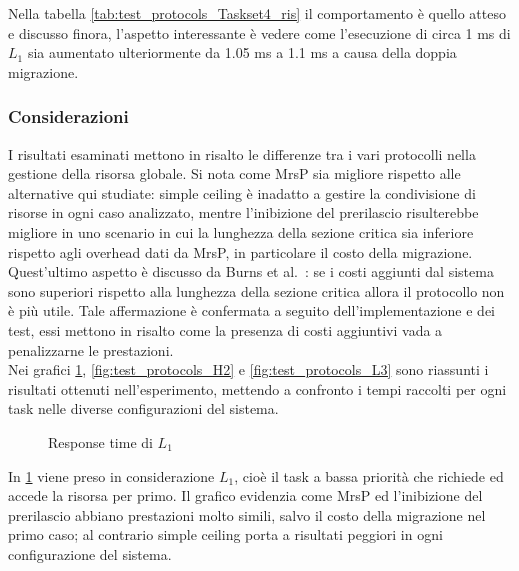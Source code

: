 \noindent Nella tabella \ref{tab:test_protocols_Taskset4_ris} il comportamento è quello atteso e discusso finora, l'aspetto interessante è vedere come l'esecuzione di circa 1 ms di $L_1$ sia aumentato ulteriormente da 1.05 ms a 1.1 ms a causa della doppia migrazione.

\subsubsection{Considerazioni}
\label{sec:confronto_protocolli_cons}

\noindent I risultati esaminati mettono in risalto le differenze tra i vari protocolli nella gestione della risorsa globale. Si nota come MrsP sia migliore rispetto alle alternative qui studiate: simple ceiling è inadatto a gestire la condivisione di risorse in ogni caso analizzato, mentre l'inibizione del prerilascio risulterebbe migliore in uno scenario in cui la lunghezza della sezione critica sia inferiore rispetto agli overhead dati da MrsP, in particolare il costo della migrazione.\\

\noindent Quest'ultimo aspetto è discusso da Burns et al.~\cite{Burns:2013:SCM:2547348.2547350}: se i costi aggiunti dal sistema sono superiori rispetto alla lunghezza della sezione critica allora il protocollo non è più utile. Tale affermazione è confermata a seguito dell'implementazione e dei test, essi mettono in risalto come la presenza di costi aggiuntivi vada a penalizzarne le prestazioni.\\

\noindent Nei grafici \ref{fig:test_protocols_L1}, \ref{fig:test_protocols_H2} e \ref{fig:test_protocols_L3} sono riassunti i risultati ottenuti nell'esperimento, mettendo a confronto i tempi raccolti per ogni task nelle diverse configurazioni del sistema.\\

\begin{figure}
  \centering
  \confrontoProtocolliLUno
  \caption{Response time di $L_1$}
  \label{fig:test_protocols_L1}
\end{figure}

\noindent In \ref{fig:test_protocols_L1} viene preso in considerazione $L_1$, cioè il task a bassa priorità che richiede ed accede la risorsa per primo. Il grafico evidenzia come MrsP ed l'inibizione del prerilascio abbiano prestazioni molto simili, salvo il costo della migrazione nel primo caso; al contrario simple ceiling porta a risultati peggiori in ogni configurazione del sistema.\\

